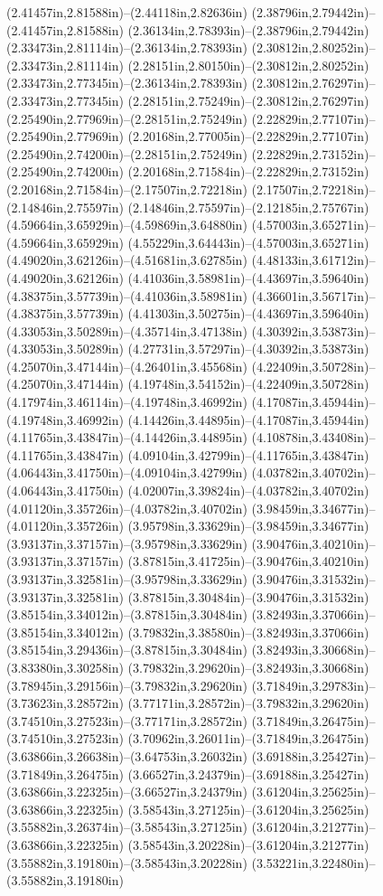 (2.41457in,2.81588in)--(2.44118in,2.82636in) (2.38796in,2.79442in)--(2.41457in,2.81588in) (2.36134in,2.78393in)--(2.38796in,2.79442in) (2.33473in,2.81114in)--(2.36134in,2.78393in) (2.30812in,2.80252in)--(2.33473in,2.81114in) (2.28151in,2.80150in)--(2.30812in,2.80252in) (2.33473in,2.77345in)--(2.36134in,2.78393in) (2.30812in,2.76297in)--(2.33473in,2.77345in) (2.28151in,2.75249in)--(2.30812in,2.76297in) (2.25490in,2.77969in)--(2.28151in,2.75249in) (2.22829in,2.77107in)--(2.25490in,2.77969in) (2.20168in,2.77005in)--(2.22829in,2.77107in) (2.25490in,2.74200in)--(2.28151in,2.75249in) (2.22829in,2.73152in)--(2.25490in,2.74200in) (2.20168in,2.71584in)--(2.22829in,2.73152in) (2.20168in,2.71584in)--(2.17507in,2.72218in) (2.17507in,2.72218in)--(2.14846in,2.75597in) (2.14846in,2.75597in)--(2.12185in,2.75767in) (4.59664in,3.65929in)--(4.59869in,3.64880in) (4.57003in,3.65271in)--(4.59664in,3.65929in) (4.55229in,3.64443in)--(4.57003in,3.65271in) (4.49020in,3.62126in)--(4.51681in,3.62785in) (4.48133in,3.61712in)--(4.49020in,3.62126in) (4.41036in,3.58981in)--(4.43697in,3.59640in) (4.38375in,3.57739in)--(4.41036in,3.58981in) (4.36601in,3.56717in)--(4.38375in,3.57739in) (4.41303in,3.50275in)--(4.43697in,3.59640in) (4.33053in,3.50289in)--(4.35714in,3.47138in) (4.30392in,3.53873in)--(4.33053in,3.50289in) (4.27731in,3.57297in)--(4.30392in,3.53873in) (4.25070in,3.47144in)--(4.26401in,3.45568in) (4.22409in,3.50728in)--(4.25070in,3.47144in) (4.19748in,3.54152in)--(4.22409in,3.50728in) (4.17974in,3.46114in)--(4.19748in,3.46992in) (4.17087in,3.45944in)--(4.19748in,3.46992in) (4.14426in,3.44895in)--(4.17087in,3.45944in) (4.11765in,3.43847in)--(4.14426in,3.44895in) (4.10878in,3.43408in)--(4.11765in,3.43847in) (4.09104in,3.42799in)--(4.11765in,3.43847in) (4.06443in,3.41750in)--(4.09104in,3.42799in) (4.03782in,3.40702in)--(4.06443in,3.41750in) (4.02007in,3.39824in)--(4.03782in,3.40702in) (4.01120in,3.35726in)--(4.03782in,3.40702in) (3.98459in,3.34677in)--(4.01120in,3.35726in) (3.95798in,3.33629in)--(3.98459in,3.34677in) (3.93137in,3.37157in)--(3.95798in,3.33629in) (3.90476in,3.40210in)--(3.93137in,3.37157in) (3.87815in,3.41725in)--(3.90476in,3.40210in) (3.93137in,3.32581in)--(3.95798in,3.33629in) (3.90476in,3.31532in)--(3.93137in,3.32581in) (3.87815in,3.30484in)--(3.90476in,3.31532in) (3.85154in,3.34012in)--(3.87815in,3.30484in) (3.82493in,3.37066in)--(3.85154in,3.34012in) (3.79832in,3.38580in)--(3.82493in,3.37066in) (3.85154in,3.29436in)--(3.87815in,3.30484in) (3.82493in,3.30668in)--(3.83380in,3.30258in) (3.79832in,3.29620in)--(3.82493in,3.30668in) (3.78945in,3.29156in)--(3.79832in,3.29620in) (3.71849in,3.29783in)--(3.73623in,3.28572in) (3.77171in,3.28572in)--(3.79832in,3.29620in) (3.74510in,3.27523in)--(3.77171in,3.28572in) (3.71849in,3.26475in)--(3.74510in,3.27523in) (3.70962in,3.26011in)--(3.71849in,3.26475in) (3.63866in,3.26638in)--(3.64753in,3.26032in) (3.69188in,3.25427in)--(3.71849in,3.26475in) (3.66527in,3.24379in)--(3.69188in,3.25427in) (3.63866in,3.22325in)--(3.66527in,3.24379in) (3.61204in,3.25625in)--(3.63866in,3.22325in) (3.58543in,3.27125in)--(3.61204in,3.25625in) (3.55882in,3.26374in)--(3.58543in,3.27125in) (3.61204in,3.21277in)--(3.63866in,3.22325in) (3.58543in,3.20228in)--(3.61204in,3.21277in) (3.55882in,3.19180in)--(3.58543in,3.20228in) (3.53221in,3.22480in)--(3.55882in,3.19180in) 